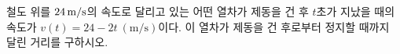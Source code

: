 철도 위를 $24\mkern3mu \mathrm{m/s}$의 속도로 달리고 있는 어떤 열차가 제동을 건 후 $t$초가 지났을 때의 속도가 $v(t)=24-2t\ (\mathrm{m/s})$이다. 이 열차가 제동을 건 후로부터 정지할 때까지 달린 거리를 구하시오.
